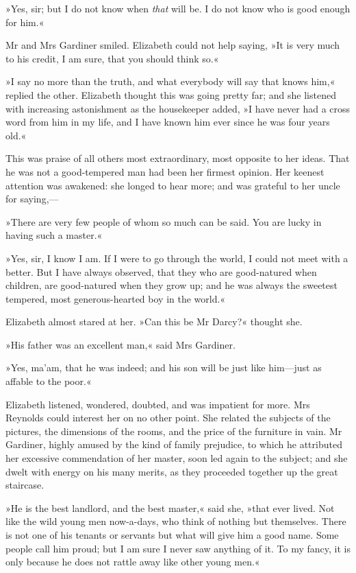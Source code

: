 »Yes, sir; but I do not know when \textit{that} will be. I do not know who is good enough for him.«

Mr and Mrs Gardiner smiled. Elizabeth could not help saying, »It is very much to his credit, I am sure, that you should think so.«

»I say no more than the truth, and what everybody will say that knows him,« replied the other. Elizabeth thought this was going pretty far; and she listened with increasing astonishment as the housekeeper added, »I have never had a cross word from him in my life, and I have known him ever since he was four years old.«

This was praise of all others most extraordinary, most opposite to her ideas. That he was not a good-tempered man had been her firmest opinion. Her keenest attention was awakened: she longed to hear more; and was grateful to her uncle for saying,—

»There are very few people of whom so much can be said. You are lucky in having such a master.«

»Yes, sir, I know I am. If I were to go through the world, I could not meet with a better. But I have always observed, that they who are good-natured when children, are good-natured when they grow up; and he was always the sweetest tempered, most generous-hearted boy in the world.«

Elizabeth almost stared at her. »Can this be Mr Darcy?« thought she.

»His father was an excellent man,« said Mrs Gardiner.

»Yes, ma'am, that he was indeed; and his son will be just like him—just as affable to the poor.«

Elizabeth listened, wondered, doubted, and was impatient for more. Mrs Reynolds could interest her on no other point. She related the subjects of the pictures, the dimensions of the rooms, and the price of the furniture in vain. Mr Gardiner, highly amused by the kind of family prejudice, to which he attributed her excessive commendation of her master, soon led again to the subject; and she dwelt with energy on his many merits, as they proceeded together up the great staircase.

»He is the best landlord, and the best master,« said she, »that ever lived. Not like the wild young men now-a-days, who think of nothing but themselves. There is not one of his tenants or servants but what will give him a good name. Some people call him proud; but I am sure I never saw anything of it. To my fancy, it is only because he does not rattle away like other young men.«

